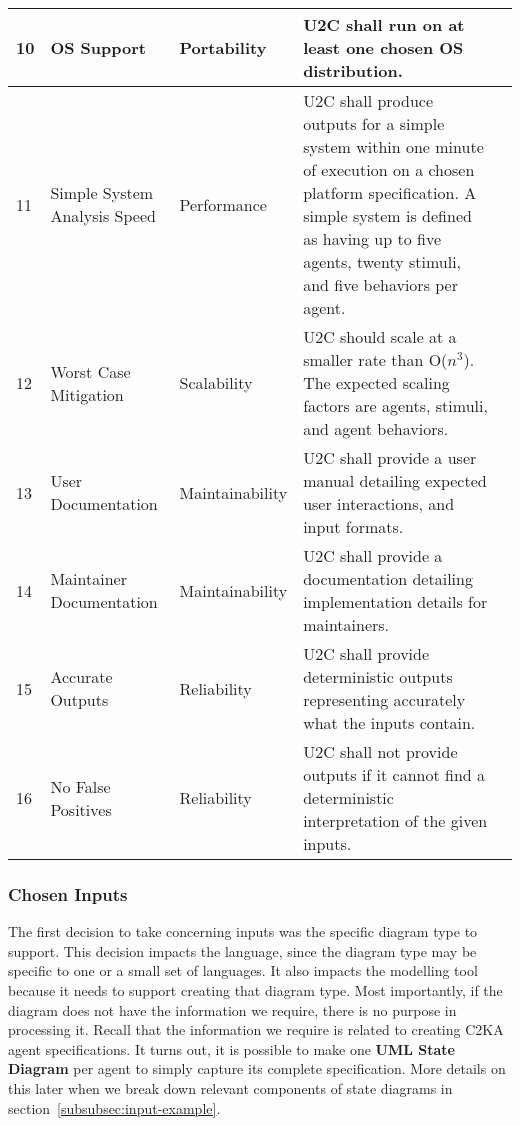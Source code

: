 \documentclass[11pt]{article}
\begin{document}
\begin{longtable}{|l|p{2.6cm}|l|p{4.5cm}|c|}
        \hline
        10 & OS Support & Portability & U2C shall run on at least one chosen OS distribution. & \cellcolor{green!30}  \\
        \hline
        11 & Simple System Analysis Speed & Performance & U2C shall produce outputs for a simple system within one minute of execution on a chosen platform specification.
        A simple system is defined as having up to five agents, twenty stimuli, and five behaviors per agent. & \cellcolor{gray!30}  \\
        \hline
        12 & Worst Case Mitigation & Scalability & U2C should scale at a smaller rate than O($n^3$). The expected scaling factors are agents, stimuli, and agent behaviors. & \cellcolor{gray!30}  \\
        \hline
        13 & User Documentation & Maintainability & U2C shall provide a user manual detailing expected user interactions, and input formats. & \cellcolor{gray!30}  \\
        \hline
        14 & Maintainer Documentation & Maintainability & U2C shall provide a documentation detailing implementation details for maintainers. & \cellcolor{green!30}  \\
        \hline
        15 & Accurate Outputs & Reliability & U2C shall provide deterministic outputs representing accurately what the inputs contain. & \cellcolor{green!30}  \\
        \hline
        16 & No False Positives & Reliability & U2C shall not provide outputs if it cannot find a deterministic interpretation of the given inputs. & \cellcolor{green!30}  \\
        \hline
    \end{longtable}

    \subsubsection{Chosen Inputs}
    The first decision to take concerning inputs was the specific diagram type to support.
    This decision impacts the language, since the diagram type may be specific to one or a small set of languages.
    It also impacts the modelling tool because it needs to support creating that diagram type.
    Most importantly, if the diagram does not have the information we require, there is no purpose in processing it.
    Recall that the information we require is related to creating C2KA agent specifications.
    It turns out, it is possible to make one \textbf{UML State Diagram} per agent to simply capture its complete specification.
    More details on this later when we break down relevant components of state diagrams in section~\ref{subsubsec:input-example}.
\end{document}
